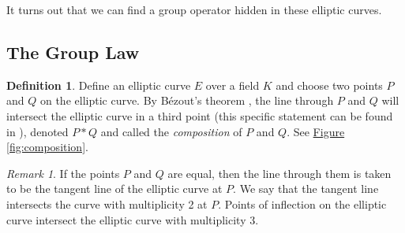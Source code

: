 \documentclass[openany, a4paper, 10pt]{book}
\theoremstyle{plain}
\theoremstyle{plain}
\theoremstyle{plain}
\theoremstyle{definition}
\newtheorem{definition}[theorem]{Definition}
\theoremstyle{plain}
\theoremstyle{definition}
\theoremstyle{remark}
\newtheorem*{remark}{Remark}
\newcommand{\figref}[1]{\hyperref[#1]{Figure \ref{#1}}}
\begin{document}
It turns out that we can find a group operator hidden in these elliptic curves.


\subsection{The Group Law}
\begin{definition}\label{def:composition}
    Define an elliptic curve $E$ over a field $K$ and choose two points $P$ and $Q$ on the elliptic curve.
    By B\'ezout's theorem
    \cite[Theorem~A.1]{silverman}
    \cite[Theorem~18.3]{algebraic_geometry}
    \cite[Chapter~3]{bezout},
    the line through $P$ and $Q$ will intersect the elliptic curve in a third point (this specific statement can be found in \cite[Section~2.2]{washington}), denoted $P * Q$ and called the \textit{composition} of $P$ and $Q$. See \figref{fig:composition}.
\end{definition}
\begin{remark}
    If the points $P$ and $Q$ are equal, then the line through them is taken to be the tangent line of the elliptic curve at $P$.
    We say that the tangent line intersects the curve with multiplicity 2 at $P$.
    Points of inflection on the elliptic curve intersect the elliptic curve with multiplicity 3.
\end{remark}
\end{document}
